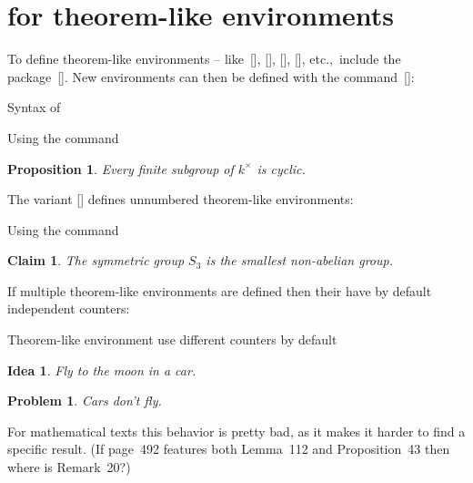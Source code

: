 \section{ for theorem-like environments}
\label{defining theorem-like environments}

To define theorem-like environments -- like~[\envname], [\envname], [\envname], [\envname], etc.,\ include the package~[\packname].
New environments can then be defined with the command~[\comname]:
\begin{showcode}{Syntax of }
\newtheorem{internal name of the environment}{name to be printed}
\end{showcode}
\begin{showlatex}{Using the command~}
\newtheorem{proposition}{Proposition}
\begin{proposition}
  Every finite subgroup of $k^\times$ is cyclic.
\end{proposition}
\end{showlatex}
The variant [\comname] defines unnumbered theorem-like environments:
\begin{showlatex}{Using the command~}
\newtheorem*{claim}{Claim}
\begin{claim}
  The symmetric group $S_3$ is the smallest non-abelian group.
\end{claim}
\end{showlatex}

If multiple theorem-like environments are defined then their have by default independent counters:
\begin{showlatex}{Theorem-like environment use different counters by default}
\newtheorem{idea}{Idea}
\newtheorem{problem}{Problem}
\begin{idea}
  Fly to the moon in a car.
\end{idea}
\begin{problem}
  Cars don't fly.
\end{problem}
\end{showlatex}
For mathematical texts this behavior is pretty bad, as it makes it harder to find a specific result.
(If page~492 features both Lemma~112 and Proposition~43 then where is Remark~20?)

